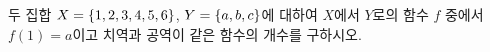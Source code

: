 두 집합 $X=\{1{,}\mkern3mu\mathopen{}2{,}\mkern3mu\mathopen{}3{,}\mkern3mu\mathopen{}4{,}\mkern3mu\mathopen{}5{,}\mkern3mu\mathopen{}6\}$, $Y=\{a{,}\mkern3mu\mathopen{}b{,}\mkern3mu\mathopen{}c\}$에 대하여 $X$에서 $Y$로의 함수 $f$ 중에서 $f(1)=a$이고 치역과 공역이 같은 함수의 개수를 구하시오.
